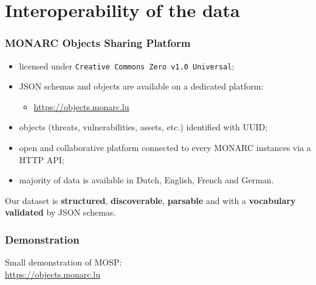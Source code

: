 \documentclass[]{beamer}
\begin{document}
\section{Interoperability of the data}
\begin{frame}
    \frametitle{MONARC Objects Sharing Platform}
    \begin{center}
        \begin{itemize}
            \item licensed under \texttt{Creative Commons Zero v1.0 Universal};
            \item JSON schemas and objects are available on a dedicated platform:\\
            \begin{itemize}
                \item \url{https://objects.monarc.lu}
            \end{itemize}
            \item objects (threats, vulnerabilities, assets, etc.) identified with UUID;
            \item open and collaborative platform connected to every MONARC instances via a HTTP API;
            \item majority of data is available in Dutch, English, French and German.
        \end{itemize}
    \end{center}
    \bigskip
    Our dataset is \textbf{structured}, \textbf{discoverable}, \textbf{parsable} and
    with a \textbf{vocabulary validated} by JSON schemas.
\end{frame}

\begin{frame}
    \frametitle{Demonstration}
    Small demonstration of MOSP:\\
    \url{https://objects.monarc.lu}
\end{frame}
\end{document}
